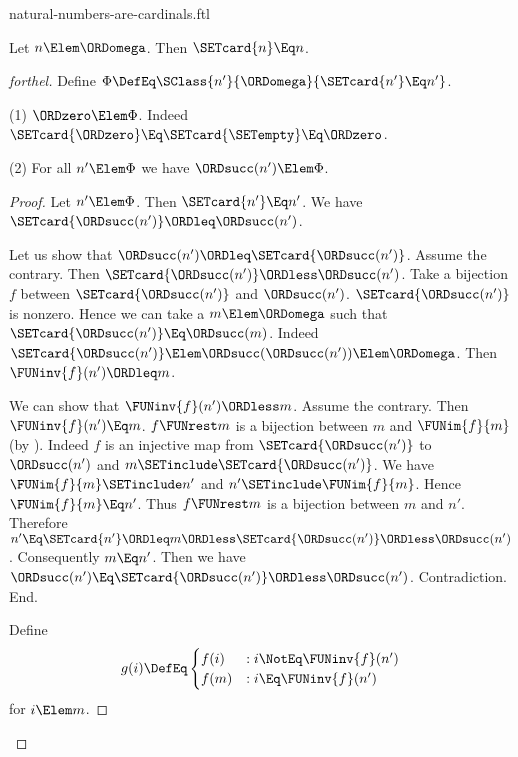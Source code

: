 \documentclass{stex}
\begin{document}
\begin{smodule}{natural-numbers-are-cardinals.ftl}

\begin{theorem}[forthel]
  Let $n \Elem \ORDomega$.
  Then $\SETcard{n} \Eq n$.
\end{theorem}
\begin{proof}[forthel]
  Define $\Phi \DefEq \SClass{n'}{\ORDomega}{\SETcard{n'} \Eq n'}$.

  (1) $\ORDzero \Elem \Phi$.
  Indeed $\SETcard{\ORDzero} \Eq \SETcard{\SETempty} \Eq \ORDzero$.

  (2) For all $n' \Elem \Phi$ we have $\ORDsucc(n') \Elem \Phi$.
  \begin{proof}
    Let $n' \Elem \Phi$.
    Then $\SETcard{n'} \Eq n'$.
    We have $\SETcard{\ORDsucc(n')} \ORDleq \ORDsucc(n')$.

    Let us show that $\ORDsucc(n') \ORDleq \SETcard{\ORDsucc(n')}$.
      Assume the contrary.
      Then $\SETcard{\ORDsucc(n')} \ORDless \ORDsucc(n')$.
      Take a bijection $f$ between $\SETcard{\ORDsucc(n')}$ and $\ORDsucc(n')$.
      $\SETcard{\ORDsucc(n')}$ is nonzero.
      Hence we can take a $m \Elem \ORDomega$ such that $\SETcard{\ORDsucc(n')} \Eq \ORDsucc(m)$.
      Indeed $\SETcard{\ORDsucc(n')} \Elem \ORDsucc(\ORDsucc(n')) \Elem \ORDomega$.
      Then $\FUNinv{f}(n') \ORDleq m$.

      We can show that $\FUNinv{f}(n') \ORDless m$.
        Assume the contrary.
        Then $\FUNinv{f}(n') \Eq m$.
        $f \FUNrest m$ is a bijection between $m$ and $\FUNim{f}{m}$ (by ).
        Indeed $f$ is an injective map from $\SETcard{\ORDsucc(n')}$ to $\ORDsucc(n')$ and
        $m \SETinclude \SETcard{\ORDsucc(n')}$.
        We have $\FUNim{f}{m} \SETinclude n'$ and $n' \SETinclude \FUNim{f}{m}$.
        Hence $\FUNim{f}{m} \Eq n'$.
        Thus $f \FUNrest m$ is a bijection between $m$ and $n'$.
        Therefore $n'
          \Eq \SETcard{n'}
          \ORDleq m
          \ORDless \SETcard{\ORDsucc(n')}
          \ORDless \ORDsucc(n')$.
        Consequently $m \Eq n'$.
        Then we have $\ORDsucc(n') \Eq \SETcard{\ORDsucc(n')} \ORDless \ORDsucc(n')$.
        Contradiction.
      End.

      Define \[ g(i) \DefEq
        \begin{cases}
          f(i)  & : i \NotEq \FUNinv{f}(n')
          \\
          f(m)  & : i \Eq \FUNinv{f}(n')
        \end{cases} \]
      for $i \Elem m$.


\end{proof}
\end{proof}
\end{smodule}
\end{document}
